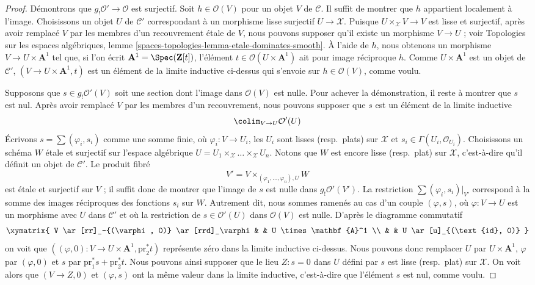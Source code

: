 \begin{proof}
\medskip\noindent
Démontrons que $g_!\mathcal{O}' \to \mathcal{O}$ est surjectif.
Soit $h \in \mathcal{O}(V)$ pour un objet $V$ de $\mathcal{C}$.
Il suffit de montrer que $h$ appartient localement à l'image. Choisissons un objet
$U$ de $\mathcal{C}'$ correspondant à un morphisme lisse surjectif
$U \to \mathcal{X}$. Puisque $U \times_\mathcal{X} V \to V$ est lisse et
surjectif, après avoir remplacé $V$ par les membres d'un recouvrement étale de $V$,
nous pouvons supposer qu'il existe un morphisme $V \to U$ ; voir
Topologies sur les espaces algébriques, lemme
\ref{spaces-topologies-lemma-etale-dominates-smooth}. À l'aide de $h$, nous obtenons
un morphisme $V \to U \times \mathbf{A}^1$ tel que, si l'on écrit
$\mathbf{A}^1 = \Spec(\mathbf{Z}[t])$, l'élément
$t \in \mathcal{O}(U \times \mathbf{A}^1)$ ait pour image réciproque $h$.
Comme $U \times \mathbf{A}^1$ est un objet de $\mathcal{C}'$,
$(V \to U \times \mathbf{A}^1, t)$ est un élément de la limite inductive
ci-dessus qui s'envoie sur $h \in \mathcal{O}(V)$,
comme voulu.

\medskip\noindent
Supposons que $s \in g_!\mathcal{O}'(V)$ soit une section
dont l'image dans $\mathcal{O}(V)$ est nulle. Pour achever la démonstration,
il reste à montrer que $s$ est nul. Après avoir remplacé $V$ par les membres
d'un recouvrement, nous pouvons supposer que $s$ est un élément de la limite inductive
$$
\colim_{V \to U} \mathcal{O}'(U)
$$
Écrivons $s = \sum (\varphi_i, s_i)$ comme une somme finie, où
$\varphi_i : V \to U_i$, les $U_i$ sont lisses (resp.\ plats) sur $\mathcal{X}$ et
$s_i \in \Gamma(U_i, \mathcal{O}_{U_i})$. Choisissons un schéma $W$ étale
et surjectif sur l'espace algébrique
$U = U_1 \times_\mathcal{X} \ldots \times_\mathcal{X} U_n$.
Notons que $W$ est encore lisse (resp.\ plat) sur $\mathcal{X}$, c'est-à-dire
qu'il définit un objet de $\mathcal{C}'$. Le produit fibré
$$
V' = V \times_{(\varphi_1, \ldots, \varphi_n), U} W
$$
est étale et surjectif sur $V$ ; il suffit donc de montrer que l'image de $s$
est nulle dans $g_!\mathcal{O}'(V')$. La restriction
$\sum (\varphi_i, s_i)|_{V'}$ correspond à la somme des images réciproques
des fonctions $s_i$ sur $W$. Autrement dit, nous sommes ramenés au cas
d'un couple $(\varphi, s)$, où $\varphi : V \to U$ est un morphisme avec $U$
dans $\mathcal{C}'$ et où la restriction de $s \in \mathcal{O}'(U)$ dans
$\mathcal{O}(V)$ est nulle. D'après le diagramme commutatif
$$
\xymatrix{
V \ar[rr]_-{(\varphi, 0)} \ar[rrd]_\varphi & & U \times \mathbf{A}^1 \\
& & U \ar[u]_{(\text{id}, 0)}
}
$$
on voit que
$((\varphi, 0) : V \to U \times \mathbf{A}^1, \text{pr}_2^*t)$
représente zéro dans la limite inductive ci-dessus. Nous pouvons donc
remplacer $U$ par $U \times \mathbf{A}^1$, $\varphi$ par $(\varphi, 0)$
et $s$ par $\text{pr}_1^*s + \text{pr}_2^*t$. Nous pouvons ainsi supposer que
le lieu $Z : s = 0$ dans $U$ défini par $s$ est lisse (resp.\ plat)
sur $\mathcal{X}$. On voit alors que $(V \to Z, 0)$ et $(\varphi, s)$
ont la même valeur dans la limite inductive, c'est-à-dire que l'élément $s$
est nul, comme voulu.
\end{proof}

